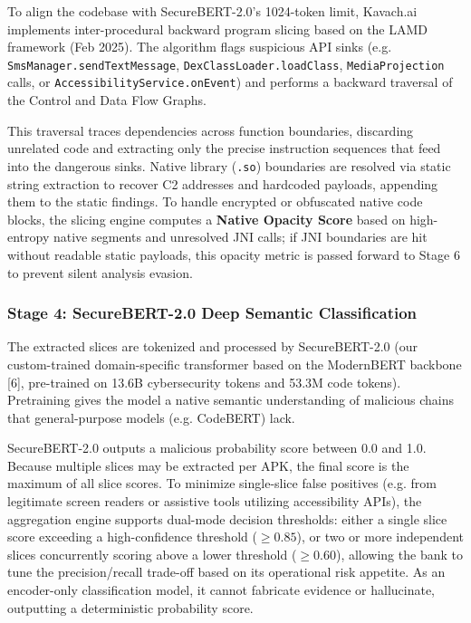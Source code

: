 \documentclass[10pt,a4paper]{article}
\begin{document}
To align the codebase with SecureBERT-2.0's 1024-token limit, Kavach.ai implements inter-procedural backward program slicing based on the LAMD framework (Feb 2025). The algorithm flags suspicious API sinks (e.g. \texttt{SmsManager.sendTextMessage}, \texttt{DexClassLoader.loadClass}, \texttt{MediaProjection} calls, or \texttt{AccessibilityService.onEvent}) and performs a backward traversal of the Control and Data Flow Graphs.

This traversal traces dependencies across function boundaries, discarding unrelated code and extracting only the precise instruction sequences that feed into the dangerous sinks. Native library (\texttt{.so}) boundaries are resolved via static string extraction to recover C2 addresses and hardcoded payloads, appending them to the static findings. To handle encrypted or obfuscated native code blocks, the slicing engine computes a \textbf{Native Opacity Score} based on high-entropy native segments and unresolved JNI calls; if JNI boundaries are hit without readable static payloads, this opacity metric is passed forward to Stage 6 to prevent silent analysis evasion.

\subsubsection*{Stage 4: SecureBERT-2.0 Deep Semantic Classification}

The extracted slices are tokenized and processed by SecureBERT-2.0 (our custom-trained domain-specific transformer based on the ModernBERT backbone [6], pre-trained on 13.6B cybersecurity tokens and 53.3M code tokens). Pretraining gives the model a native semantic understanding of malicious chains that general-purpose models (e.g. CodeBERT) lack.

SecureBERT-2.0 outputs a malicious probability score between 0.0 and 1.0. Because multiple slices may be extracted per APK, the final score is the maximum of all slice scores. To minimize single-slice false positives (e.g. from legitimate screen readers or assistive tools utilizing accessibility APIs), the aggregation engine supports dual-mode decision thresholds: either a single slice score exceeding a high-confidence threshold ($\geq 0.85$), or two or more independent slices concurrently scoring above a lower threshold ($\geq 0.60$), allowing the bank to tune the precision/recall trade-off based on its operational risk appetite. As an encoder-only classification model, it cannot fabricate evidence or hallucinate, outputting a deterministic probability score.
\end{document}
